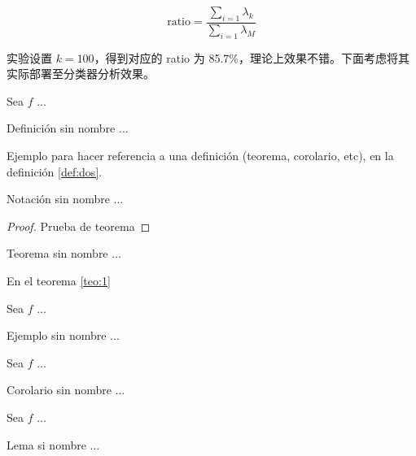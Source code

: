 \documentclass[fleqn]{Paquetes/RevDigMatEduInt}
\begin{document}
\begin{lema}
$$\mathrm{ratio}=\frac{\sum_{i=1}\lambda_{k}}{\sum_{i=1}\lambda_M}$$
\end{lema}

实验设置 $k=100$，得到对应的 ratio 为 85.7\%，理论上效果不错。下面考虑将其实际部署至分类器分析效果。



\begin{definicion}
	Sea $f$ ...
\end{definicion}

\begin{definicion}
Definición sin nombre ...
\end{definicion}

Ejemplo para hacer referencia a una definición (teorema, corolario, etc), en la definición \ref{def:dos}.

\begin{notacion}
	Notación sin nombre ...
\end{notacion}



\begin{proof}
	Prueba de teorema
\end{proof}

\begin{teorema}
Teorema sin nombre ...
\end{teorema}

En el teorema \ref{teo:1}

\begin{ejemplo}
	Sea $f$ ...
\end{ejemplo}

\begin{ejemplo}
	Ejemplo sin nombre ...
\end{ejemplo}

\begin{corolario}
	Sea $f$ ...
\end{corolario}

\begin{corolario}
Corolario sin nombre ...
\end{corolario}

\begin{lema}
Sea $f$ ...
\end{lema}

\begin{lema}
Lema si nombre ...
\end{lema}
\end{document}
